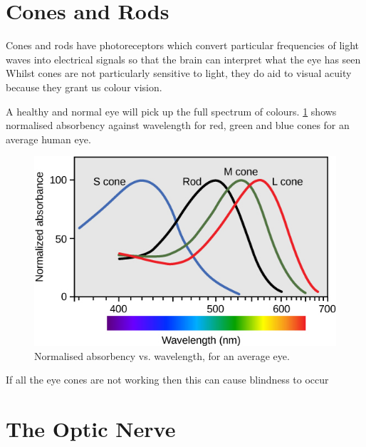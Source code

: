 \section{Cones and Rods}

Cones and rods have photoreceptors which convert particular frequencies of
light waves into electrical signals so that the brain can interpret what
the eye has seen Whilst cones are not particularly sensitive to light,
they do aid to visual acuity because they grant us colour vision.\cite{}

A healthy and normal eye will pick up the full spectrum of colours. \ref{fig:wavelengths} shows normalised absorbency against wavelength for red, green and blue cones for an average human eye.

\begin{figure}[htbp]
  \centering
    \includegraphics{figures/wavelengths}
  \caption{Normalised absorbency vs. wavelength, for an average eye.}
  \label{fig:wavelengths}
\end{figure}

If all the eye cones are not working then this can cause blindness to occur\cite{}

\section{The Optic Nerve}
